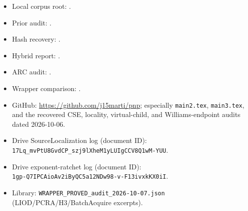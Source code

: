 \documentclass[11pt]{article}
\begin{document}
\begingroup
\scriptsize
\begin{itemize}
  \item Local corpus root: .
  \item Prior audit: .
  \item Hash recovery: .
  \item Hybrid report: .
  \item ARC audit: .
  \item Wrapper comparison: .
  \item GitHub: \url{https://github.com/j15marti/pnp}; especially \texttt{main2.tex}, \texttt{main3.tex}, and the recovered CSE, locality, virtual-child, and Williams-endpoint audits dated 2026-10-06.
  \item Drive SourceLocalization log (document ID):\\
    \texttt{17Lq\_mvPtU8GvdCP\_szj9lXheM1yLUIgCCV8Q1wM-YUU}.
  \item Drive exponent-ratchet log (document ID):\\
    \texttt{1gp-Q7IPCAioAv2iByQC5a12NDw98-v-F13ivxkKX0iI}.
  \item Library: \texttt{WRAPPER\_PROVED\_audit\_2026-10-07.json} (LIOD/PCRA/H3/BatchAcquire excerpts).
\end{itemize}
\endgroup
\end{document}
